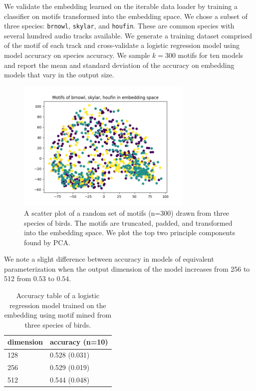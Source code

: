 \documentclass[
]{ceurart}
\begin{document}
We validate the embedding learned on the iterable data loader by training a classifier on motifs transformed into the embedding space. We chose a subset of three species: \texttt{brnowl}, \texttt{skylar}, and \texttt{houfin}. These are common species with several hundred audio tracks available. We generate a training dataset comprised of the motif of each track and cross-validate a logistic regression model using model accuracy on species accuracy. We sample $k=300$ motifs for ten models and report the mean and standard deviation of the accuracy on embedding models that vary in the output size.

\begin{figure}[h]
    \centering
    \includegraphics[width=0.75\textwidth]{figures/interclass.png}
    \caption{A scatter plot of a random set of motifs (n=300) drawn from three species of birds. The motifs are truncated, padded, and transformed into the embedding space. We plot the top two principle components found by PCA. }
    \label{fig:my_label}
\end{figure}

We note a slight difference between accuracy in models of equivalent parameterization when the output dimension of the model increases from 256 to 512 from $0.53$ to $0.54$.

\begin{table}[h]
\begin{tabular}{|l|l|}
\hline
dimension & accuracy (n=10) \\ \hline
128       & 0.528 (0.031)   \\ \hline
256       & 0.529 (0.019)   \\ \hline
512       & 0.544 (0.048)   \\ \hline
\end{tabular}
\caption{Accuracy table of a logistic regression model trained on the embedding using motif mined from three species of birds. }
\label{tab:emb-acc}
\end{table}
\end{document}
